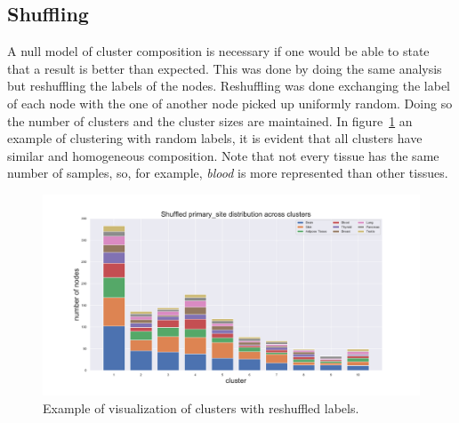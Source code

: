\subsection{Shuffling}
A null model of cluster composition is necessary if one would be able to state that a result is better than expected. This was done by doing the same analysis but reshuffling the labels of the nodes. Reshuffling was done exchanging the label of each node with the one of another node picked up uniformly random. Doing so the number of clusters and the cluster sizes are maintained. In figure~\ref{fig:topic/gtex/oversigma_10tissue/shuffledclustercomposition_l3_primary_site} an example of clustering with random labels, it is evident that all clusters have similar and homogeneous composition. Note that not every tissue has the same number of samples, so, for example, \textit{blood} is more represented than other tissues.
\begin{figure}[htb!]
	\centering
	\includegraphics[width=0.8\linewidth]{pictures/topic/gtex/oversigma_10tissue/shuffledclustercomposition_l3_primary_site}
	\caption{Example of visualization of clusters with reshuffled labels.}
	\label{fig:topic/gtex/oversigma_10tissue/shuffledclustercomposition_l3_primary_site}
\end{figure}

